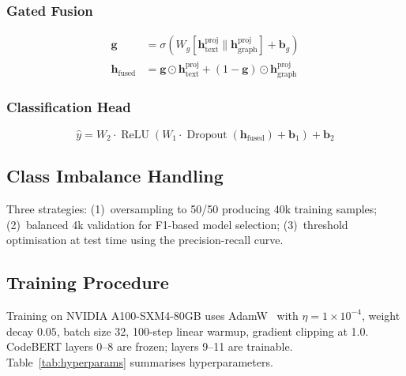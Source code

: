 \documentclass[12pt, letterpaper]{article}
\begin{document}
\subsubsection{Gated Fusion}

\begin{align}
\mathbf{g}&=\sigma\!\left(W_g
  [\mathbf{h}_{\text{text}}^{\text{proj}}\|\mathbf{h}_{\text{graph}}^{\text{proj}}]
  +\mathbf{b}_g\right)
\label{eq:gate}\\
\mathbf{h}_{\text{fused}}&=\mathbf{g}\odot\mathbf{h}_{\text{text}}^{\text{proj}}
  +(1-\mathbf{g})\odot\mathbf{h}_{\text{graph}}^{\text{proj}}
\label{eq:fusion}
\end{align}

\subsubsection{Classification Head}
\begin{equation}
\hat{y}=W_2\cdot\operatorname{ReLU}\!\left(
  W_1\cdot\operatorname{Dropout}(\mathbf{h}_{\text{fused}})+\mathbf{b}_1
\right)+\mathbf{b}_2
\label{eq:classifier}
\end{equation}

\subsection{Class Imbalance Handling}

Three strategies: (1)~oversampling to 50/50 producing 40k training samples;
(2)~balanced 4k validation for F1-based model selection;
(3)~threshold optimisation at test time using the precision-recall curve.

\subsection{Training Procedure}

Training on NVIDIA A100-SXM4-80GB uses AdamW~\citep{loshchilov2019}
with $\eta{=}1{\times}10^{-4}$, weight decay $0.05$, batch size 32,
100-step linear warmup, gradient clipping at 1.0.
CodeBERT layers 0--8 are frozen; layers 9--11 are trainable.
Table~\ref{tab:hyperparams} summarises hyperparameters.
\end{document}
